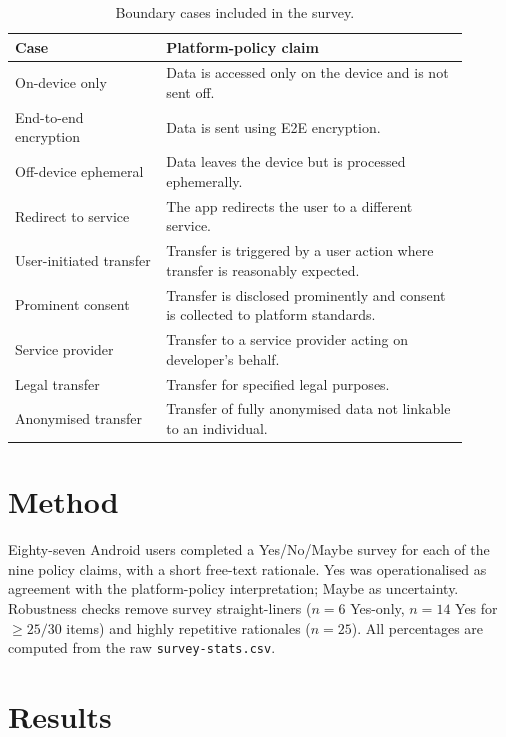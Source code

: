 \documentclass[11pt,a4paper]{article}
\begin{document}
\begin{table}[h]
\centering\small
\caption{Boundary cases included in the survey.}
\label{tab:boundary-cases}
\begin{tabular}{p{0.30\linewidth}p{0.60\linewidth}}
\toprule
\textbf{Case} & \textbf{Platform-policy claim} \\
\midrule
On-device only & Data is accessed only on the device and is not sent off. \\
End-to-end encryption & Data is sent using E2E encryption. \\
Off-device ephemeral & Data leaves the device but is processed ephemerally. \\
Redirect to service & The app redirects the user to a different service. \\
User-initiated transfer & Transfer is triggered by a user action where transfer
is reasonably expected. \\
Prominent consent & Transfer is disclosed prominently and consent is collected
to platform standards. \\
Service provider & Transfer to a service provider acting on developer's behalf. \\
Legal transfer & Transfer for specified legal purposes. \\
Anonymised transfer & Transfer of fully anonymised data not linkable to an
individual. \\
\bottomrule
\end{tabular}
\end{table}

\section{Method}
Eighty-seven Android users completed a Yes/No/Maybe survey for each of the
nine policy claims, with a short free-text rationale. Yes was operationalised
as agreement with the platform-policy interpretation; Maybe as uncertainty.
Robustness checks remove survey straight-liners ($n=6$ Yes-only, $n=14$
Yes for $\geq25/30$ items) and highly repetitive rationales ($n=25$). All
percentages are computed from the raw \texttt{survey-stats.csv}.

\section{Results}
\end{document}
